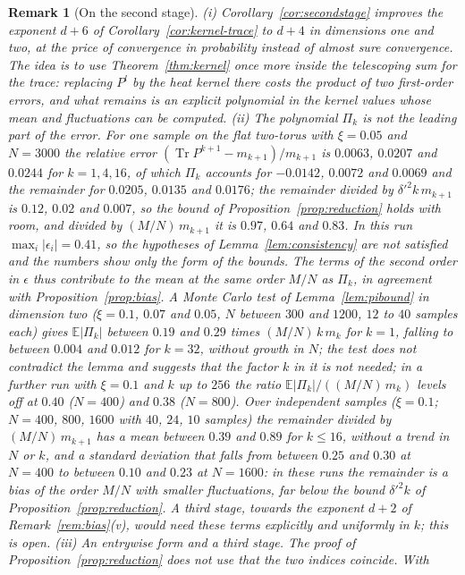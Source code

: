\documentclass[11pt,a4paper]{article}
\theoremstyle{stmt}
\theoremstyle{defn}
\theoremstyle{rmk}
\newtheorem{remark}[theorem]{Remark}
\numberwithin{equation}{section}
\DeclareMathOperator{\Tr}{Tr}
\begin{document}
{\begin{remark}[On the second stage]\label{rem:secondstage}
(i) Corollary~\ref{cor:secondstage} improves the exponent $d+6$ of Corollary~\ref{cor:kernel-trace} to $d+4$ in dimensions one and two, at the price of convergence in probability instead of almost sure convergence. The idea is to use Theorem~\ref{thm:kernel} once more inside the telescoping sum for the trace: replacing $P^l$ by the heat kernel there costs the product of two first-order errors, and what remains is an explicit polynomial in the kernel values whose mean and fluctuations can be computed. (ii) The polynomial $\Pi_k$ is not the leading part of the error. For one sample on the flat two-torus with $\xi=0.05$ and $N=3000$ the relative error $(\Tr P^{k+1}-m_{k+1})/m_{k+1}$ is $0.0063$, $0.0207$ and $0.0244$ for $k=1,4,16$, of which $\Pi_k$ accounts for $-0.0142$, $0.0072$ and $0.0069$ and the remainder for $0.0205$, $0.0135$ and $0.0176$; the remainder divided by $\delta'^2k\,m_{k+1}$ is $0.12$, $0.02$ and $0.007$, so the bound of Proposition~\ref{prop:reduction} holds with room, and divided by $(M/N)\,m_{k+1}$ it is $0.97$, $0.64$ and $0.83$. In this run $\max_i|\epsilon_i|=0.41$, so the hypotheses of Lemma~\ref{lem:consistency} are not satisfied and the numbers show only the form of the bounds. The terms of the second order in $\epsilon$ thus contribute to the mean at the same order $M/N$ as $\Pi_k$, in agreement with Proposition~\ref{prop:bias}. A Monte Carlo test of Lemma~\ref{lem:pibound} in dimension two ($\xi=0.1$, $0.07$ and $0.05$, $N$ between $300$ and $1200$, $12$ to $40$ samples each) gives $\mathbb E|\Pi_k|$ between $0.19$ and $0.29$ times $(M/N)\,k\,m_k$ for $k=1$, falling to between $0.004$ and $0.012$ for $k=32$, without growth in $N$; the test does not contradict the lemma and suggests that the factor $k$ in it is not needed; in a further run with $\xi=0.1$ and $k$ up to $256$ the ratio $\mathbb E|\Pi_k|/((M/N)\,m_k)$ levels off at $0.40$ ($N=400$) and $0.38$ ($N=800$). Over independent samples ($\xi=0.1$; $N=400$, $800$, $1600$ with $40$, $24$, $10$ samples) the remainder divided by $(M/N)\,m_{k+1}$ has a mean between $0.39$ and $0.89$ for $k\le16$, without a trend in $N$ or $k$, and a standard deviation that falls from between $0.25$ and $0.30$ at $N=400$ to between $0.10$ and $0.23$ at $N=1600$: in these runs the remainder is a bias of the order $M/N$ with smaller fluctuations, far below the bound $\delta'^2k$ of Proposition~\ref{prop:reduction}. A third stage, towards the exponent $d+2$ of Remark~\ref{rem:bias}(v), would need these terms explicitly and uniformly in $k$; this is open. (iii) \emph{An entrywise form and a third stage.} The proof of Proposition~\ref{prop:reduction} does not use that the two indices coincide. With

\end{remark}}
\end{document}
